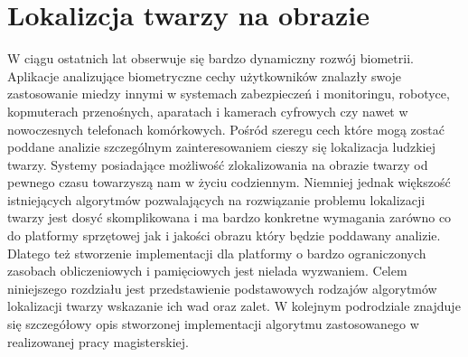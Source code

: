 \section{Lokalizcja twarzy na obrazie}

W ciągu ostatnich lat obserwuje się bardzo dynamiczny rozwój biometrii.
Aplikacje analizujące biometryczne cechy użytkowników znalazły swoje
zastosowanie miedzy innymi w systemach zabezpieczeń i monitoringu, robotyce,
kopmuterach przenośnych, aparatach i kamerach cyfrowych czy nawet w nowoczesnych
telefonach komórkowych. Pośród szeregu cech które mogą zostać poddane analizie
szczególnym zainteresowaniem cieszy się lokalizacja ludzkiej twarzy. Systemy
posiadające możliwość zlokalizowania na obrazie twarzy od pewnego czasu
towarzyszą nam w życiu codziennym. Niemniej jednak większość istniejących
algorytmów pozwalających na rozwiązanie problemu lokalizacji twarzy jest dosyć
skomplikowana i ma bardzo konkretne wymagania zarówno co do platformy sprzętowej
jak i jakości obrazu który będzie poddawany analizie. Dlatego też stworzenie
implementacji dla platformy o bardzo ograniczonych zasobach obliczeniowych i
pamięciowych jest nielada wyzwaniem. Celem niniejszego rozdziału jest
przedstawienie podstawowych rodzajów algorytmów lokalizacji twarzy wskazanie ich
wad oraz zalet. W kolejnym podrodziale znajduje się szczegółowy opis stworzonej
implementacji algorytmu zastosowanego w realizowanej pracy magisterskiej.


